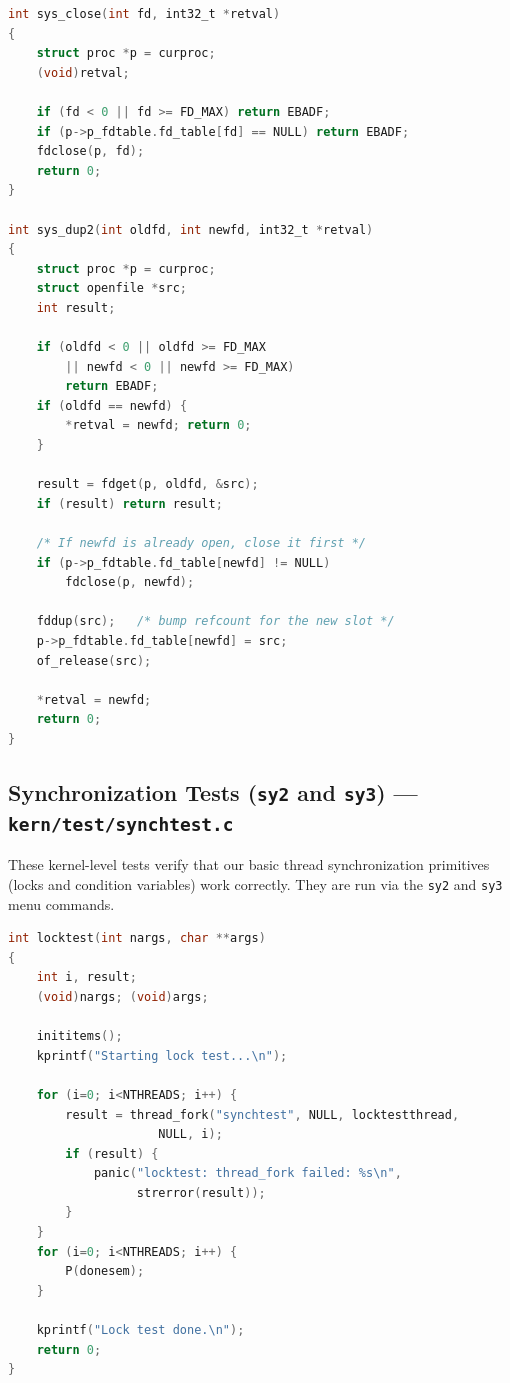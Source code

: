 \documentclass[11pt,a4paper]{article}
\begin{document}
\begin{lstlisting}[language=C,
  caption={\texttt{sys\_close} and \texttt{sys\_dup2} ---
           closing and duplicating file descriptors.}]
int sys_close(int fd, int32_t *retval)
{
	struct proc *p = curproc;
	(void)retval;

	if (fd < 0 || fd >= FD_MAX) return EBADF;
	if (p->p_fdtable.fd_table[fd] == NULL) return EBADF;
	fdclose(p, fd);
	return 0;
}

int sys_dup2(int oldfd, int newfd, int32_t *retval)
{
	struct proc *p = curproc;
	struct openfile *src;
	int result;

	if (oldfd < 0 || oldfd >= FD_MAX
	    || newfd < 0 || newfd >= FD_MAX)
		return EBADF;
	if (oldfd == newfd) {
		*retval = newfd; return 0;
	}

	result = fdget(p, oldfd, &src);
	if (result) return result;

	/* If newfd is already open, close it first */
	if (p->p_fdtable.fd_table[newfd] != NULL)
		fdclose(p, newfd);

	fddup(src);   /* bump refcount for the new slot */
	p->p_fdtable.fd_table[newfd] = src;
	of_release(src);

	*retval = newfd;
	return 0;
}
\end{lstlisting}

\FloatBarrier
\newpage
\subsection{Synchronization Tests (\texttt{sy2} and \texttt{sy3}) ---
            \texttt{kern/test/synchtest.c}}
These kernel-level tests verify that our basic thread synchronization
primitives (locks and condition variables) work correctly. They are run
via the \texttt{sy2} and \texttt{sy3} menu commands.

\begin{lstlisting}[language=C,
  caption={\texttt{locktest} (\texttt{sy2}) --- forks threads that
           concurrently acquire a lock to update shared variables.}]
int locktest(int nargs, char **args)
{
	int i, result;
	(void)nargs; (void)args;

	inititems();
	kprintf("Starting lock test...\n");

	for (i=0; i<NTHREADS; i++) {
		result = thread_fork("synchtest", NULL, locktestthread,
				     NULL, i);
		if (result) {
			panic("locktest: thread_fork failed: %s\n",
			      strerror(result));
		}
	}
	for (i=0; i<NTHREADS; i++) {
		P(donesem);
	}

	kprintf("Lock test done.\n");
	return 0;
}
\end{lstlisting}
\end{document}
